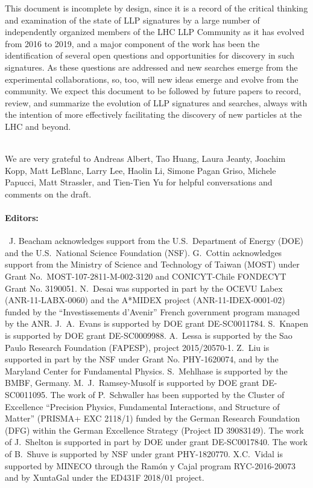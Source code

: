 This document is incomplete by design, since it is a record of the critical thinking and examination of the state of LLP signatures by a large number of independently organized members of the LHC LLP Community as it has evolved from 2016 to 2019, and a major component of the work has been the identification of several open questions and opportunities for discovery in such signatures.
As these questions are addressed and new searches emerge from the experimental collaborations, so, too, will new ideas emerge and evolve from the community.
We expect this document to be followed by future papers to record, review, and summarize the evolution of LLP signatures and searches, always with the intention of more effectively facilitating the discovery of new particles at the LHC and beyond. \\

\vspace{\baselineskip}

\\

We are very grateful to Andreas Albert, Tao Huang, Laura Jeanty, Joachim Kopp, Matt LeBlanc, Larry Lee, Haolin Li, Simone Pagan Griso, Michele Papucci, Matt Strassler, and Tien-Tien Yu for helpful conversations and comments on the draft.\\

\paragraph{Editors:}~J. Beacham acknowledges support from the U.S.~Department of Energy (DOE) and the U.S.~National Science Foundation (NSF). G.~Cottin acknowledges support from the Ministry of Science and Technology of Taiwan (MOST) under Grant No.~MOST-107-2811-M-002-3120 and CONICYT-Chile FONDECYT Grant No. 3190051. N.~Desai was supported in part by the OCEVU Labex (ANR-11-LABX-0060) and the A*MIDEX project (ANR-11-IDEX-0001-02) funded by the ``Investissements d'Avenir'' French government program managed by the ANR. J.~A.~Evans is supported by DOE grant DE-SC0011784. S.~Knapen is supported by DOE grant DE-SC0009988. A.~Lessa is supported by the Sao Paulo Research Foundation (FAPESP), project 2015/20570-1. Z.~Liu is supported in part by the NSF under Grant No. PHY-1620074, and by the Maryland Center for Fundamental Physics. S.~Mehlhase is supported by the BMBF, Germany. M.~J.~Ramsey-Musolf is supported by DOE grant DE-SC0011095. The work of P.~Schwaller has been supported by the Cluster of Excellence ``Precision Physics, Fundamental Interactions, and Structure of Matter'' (PRISMA+ EXC 2118/1) funded by the German Research Foundation (DFG) within the German Excellence Strategy (Project ID 39083149). The work of J.~Shelton is supported in part by DOE under grant DE-SC0017840. The work of B.~Shuve is supported by NSF under grant PHY-1820770. X.C.~Vidal is supported by MINECO through the Ramón y Cajal program RYC-2016-20073 and by XuntaGal under the ED431F 2018/01 project. \\


